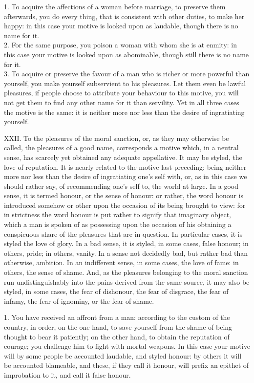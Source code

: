 \documentclass[12pt]{report}
\begin{document}
1. To acquire the affections of a woman before marriage, to preserve
them afterwards, you do every thing, that is consistent with other
duties, to make her happy: in this case your motive is looked upon as
laudable, though there is no name for it.\\
2. For the same purpose, you poison a woman with whom she is at enmity:
in this case your motive is looked upon as abominable, though still
there is no name for it.\\
3. To acquire or preserve the favour of a man who is richer or more
powerful than yourself, you make yourself subservient to his pleasures.
Let them even be lawful pleasures, if people choose to attribute your
behaviour to this motive, you will not get them to find any other name
for it than servility. Yet in all three cases the motive is the same: it
is neither more nor less than the desire of ingratiating yourself.

XXII. To the pleasures of the moral sanction, or, as they may otherwise
be called, the pleasures of a good name, corresponds a motive which, in
a neutral sense, has scarcely yet obtained any adequate appellative. It
may be styled, the love of reputation. It is nearly related to the
motive last preceding: being neither more nor less than the desire of
ingratiating one's self with, or, as in this case we should rather say,
of recommending one's self to, the world at large. In a good sense, it
is termed honour, or the sense of honour: or rather, the word honour is
introduced somehow or other upon the occasion of its being brought to
view: for in strictness the word honour is put rather to signify that
imaginary object, which a man is spoken of as possessing upon the
occasion of his obtaining a conspicuous share of the pleasures that are
in question. In particular cases, it is styled the love of glory. In a
bad sense, it is styled, in some cases, false honour; in others, pride;
in others, vanity. In a sense not decidedly bad, but rather bad than
otherwise, ambition. In an indifferent sense, in some cases, the love of
fame: in others, the sense of shame. And, as the pleasures belonging to
the moral sanction run undistinguishably into the pains derived from the
same source, it may also be styled, in some cases, the fear of
dishonour, the fear of disgrace, the fear of infamy, the fear of
ignominy, or the fear of shame.

1. You have received an affront from a man: according to the custom of
the country, in order, on the one hand, to save yourself from the shame
of being thought to bear it patiently; on the other hand, to obtain the
reputation of courage; you challenge him to fight with mortal weapons.
In this case your motive will by some people be accounted laudable, and
styled honour: by others it will be accounted blameable, and these, if
they call it honour, will prefix an epithet of improbation to it, and
call it false honour.
\end{document}
